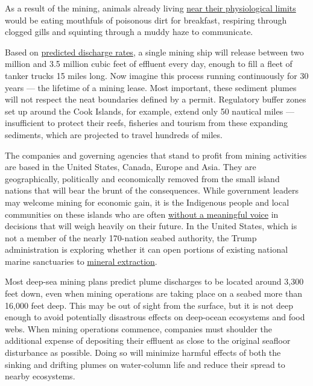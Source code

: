 As a result of the mining, animals already living
\href{https://www.scientificamerican.com/article/the-ocean-is-running-out-of-breath-scientists-warn/}{near
their physiological limits} would be eating mouthfuls of poisonous dirt
for breakfast, respiring through clogged gills and squinting through a
muddy haze to communicate.

Based on
\href{https://www.researchgate.net/publication/267704135_Anthropogenic_impacts_on_the_deep_sea}{predicted
discharge rates}, a single mining ship will release between two million
and 3.5 million cubic feet of effluent every day, enough to fill a fleet
of tanker trucks 15 miles long. Now imagine this process running
continuously for 30 years --- the lifetime of a mining lease. Most
important, these sediment plumes will not respect the neat boundaries
defined by a permit. Regulatory buffer zones set up around the Cook
Islands, for example, extend only 50 nautical miles --- insufficient to
protect their reefs, fisheries and tourism from these expanding
sediments, which are projected to travel hundreds of miles.

The companies and governing agencies that stand to profit from mining
activities are based in the United States, Canada, Europe and Asia. They
are geographically, politically and economically removed from the small
island nations that will bear the brunt of the consequences. While
government leaders may welcome mining for economic gain, it is the
Indigenous people and local communities on these islands who are often
\href{https://www.theguardian.com/world/2019/oct/20/cook-islands-manager-of-worlds-biggest-marine-park-says-she-lost-job-for-backing-sea-mining-moratorium}{without
a meaningful voice} in decisions that will weigh heavily on their
future. In the United States, which is not a member of the nearly
170-nation seabed authority, the Trump administration is exploring
whether it can open portions of existing national marine sanctuaries to
\href{https://www.washingtonpost.com/news/energy-environment/wp/2017/04/28/trump-signs-executive-order-to-expand-offshore-drilling-and-analyze-marine-sanctuaries-oil-and-gas-potential/}{mineral
extraction}.

Most deep-sea mining plans predict plume discharges to be located around
3,300 feet down, even when mining operations are taking place on a
seabed more than 16,000 feet deep. This may be out of sight from the
surface, but it is not deep enough to avoid potentially disastrous
effects on deep-ocean ecosystems and food webs. When mining operations
commence, companies must shoulder the additional expense of depositing
their effluent as close to the original seafloor disturbance as
possible. Doing so will minimize harmful effects of both the sinking and
drifting plumes on water-column life and reduce their spread to nearby
ecosystems.

